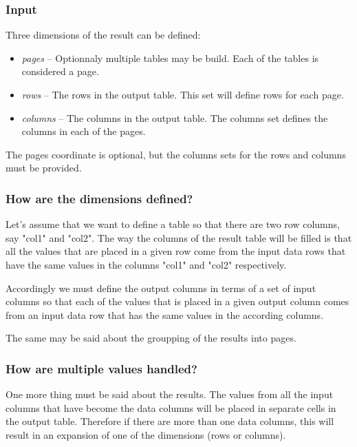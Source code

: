 \documentclass{report}
\begin{document}
\subsubsection{Input}
Three dimensions of the result can be defined:

\begin{itemize}
	\item \textit{pages} -- Optionnaly multiple tables may be build. Each
		of the tables is considered a page.
	\item \textit{rows} -- The rows in the output table. This set will define
		rows for each page.
	\item \textit{columns} -- The columns in the output table. The columns
		set defines the columns in each of the pages.
\end{itemize}

The pages coordinate is optional, but the columns sets for the rows and columns
must be provided.

\subsubsection{How are the dimensions defined?}
Let's assume that we want to define a table so that there are two row columns,
say "col1" and "col2". The way the columns of the result table will be filled
is that all the values that are placed in a given row come from the input data
rows that have the same values in the columns "col1" and "col2" respectively.

Accordingly we must define the output columns in terms of a set of input columns
so that each of the values that is placed in a given output column comes from
an input data row that has the same values in the according columns.

The same may be said about the groupping of the results into pages.

\subsubsection{How are multiple values handled?}
One more thing must be said about the results. The values from all the input
columns that have become the data columns will be placed in separate cells in the
output table. Therefore if there are more than one data columns, this will result
in an expansion of one of the dimensions (rows or columns).
\end{document}
